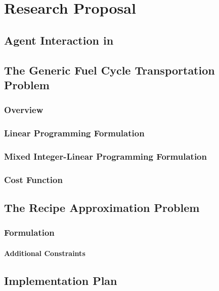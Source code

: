 \chapter{Research Proposal}\label{ch:research}



\section{Agent Interaction in \Cyclus}\label{sec:agent-interaction}


\section{The Generic Fuel Cycle Transportation Problem}\label{sec:gfctp}

\subsection{Overview}



\subsection{Linear Programming Formulation}\label{sec:gfctp-lp}



\subsection{Mixed Integer-Linear Programming Formulation}

\label{sec:gfctp-ip}

\subsection{Cost Function}\label{sec:cost-function}



\section{The Recipe Approximation Problem}\label{sec:rap}



\subsection{Formulation}



\subsubsection{Additional Constraints}



\section{Implementation Plan}\label{sec:plan}


